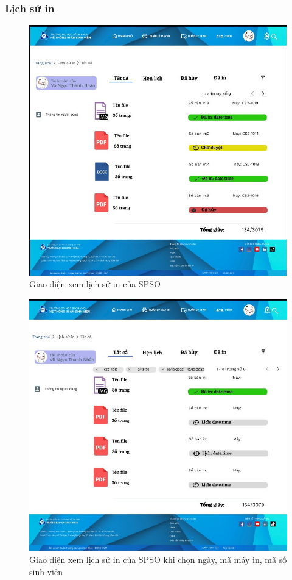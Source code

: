 \subsubsection{Lịch sử in}
\begin{figure}[H]
    \begin{center}
        \includegraphics[width=1\textwidth]{Images/Figma/history_main.png}
        \caption{Giao diện xem lịch sử in của SPSO}
        \label{fig:arch}
    \end{center}
\end{figure}
\begin{figure}[H]
    \begin{center}
        \includegraphics[width=1\textwidth]{Images/Figma/history_filter.png}
        \caption{Giao diện xem lịch sử in của SPSO khi chọn ngày, mã máy in, mã số sinh viên}
        \label{fig:arch}
    \end{center}
\end{figure}
